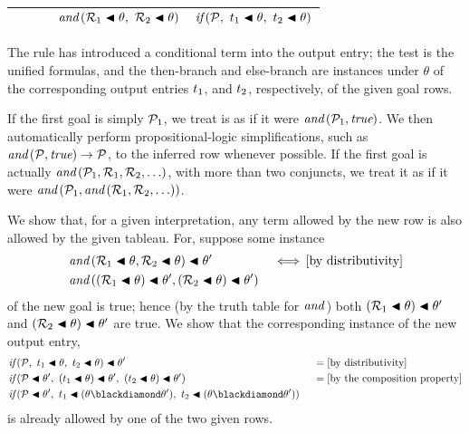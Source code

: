 \documentclass[runningheads]{llncs}
\DeclareMathOperator{\uand}{\emph{and}\,}
\DeclareMathOperator{\uiff}{\iff}
\begin{document}
  \begin{center}
\begin{tabular} {T}
\hline
    $\qquad$ & $\uand(\expsub{\mathcal{R}}{1} \apply \theta, \ \expsub{\mathcal{R}}{2} \apply \theta)$ &  $\emph{if}\,( {\mathcal{P}},\allowbreak \ {{t}_{1} \blacktriangleleft \theta},\allowbreak \ {{t}_{2} \blacktriangleleft \theta})$ \\
  \hline
\end{tabular}
\end{center}

\noindent The rule has introduced a conditional term into the output entry;  the test is the unified formulas, and the then-branch and else-branch are instances under $\theta$ of the corresponding output entries  ${t}_{1}$, and ${t}_{2}$, respectively, of the given goal rows.

If the first goal is simply ${\mathcal{P}}_{1}$, we treat is as if it were $\uand(\expsub{\mathcal{P}}{1},\true)$. We then automatically perform propositional-logic simplifications, such as $\uand(\mathcal{P}, \true) \rightarrow \mathcal{P}$, to the inferred row whenever possible.  If the first goal is actually 
$\uand(\expsub{\mathcal{P}}{1},\expsub{\mathcal{R}}{1},\allowbreak \expsub{\mathcal{R}}{2}, \ldots)$, with more than two conjuncts, we treat it as if it were $\uand(\expsub{\mathcal{P}}{1}, \uand(\expsub{\mathcal{R}}{1},\allowbreak \expsub{\mathcal{R}}{2}, \ldots))$.

We show that, for a given interpretation, any term allowed by the new row is also allowed by the given tableau. For, suppose some instance  
\begin{align*}
&\uand(
\expsub{\mathcal{R}}{1}\apply \theta,
\expsub{\mathcal{R}}{2}\apply \theta) \apply \theta' \  \, &&\uiff 
   \text{[by distributivity]} \\
&\uand(
(\expsub{\mathcal{R}}{1}\apply \theta)\apply \theta',
(\expsub{\mathcal{R}}{2}\apply \theta)\apply \theta') 
\end{align*}
of the new goal  is true; hence (by the truth table for $\uand$) both $({\mathcal{R}}_{1}\blacktriangleleft \theta)\blacktriangleleft \theta'$ and $({\mathcal{R}}_{2}\blacktriangleleft \theta)\blacktriangleleft \theta'$ are true. We show that the corresponding instance  
of the new output entry,
 \begin{align*}
   &\cond 
   {\mathcal{P}} 
   {\expsub{t}{1} \apply \theta} 
   {\expsub{t}{2} \apply \theta} \apply \theta'\
      &&=  \text{[by distributivity]} \\
     &\cond 
     {\mathcal{P}\apply \theta'} 
     {(\expsub{t}{1} \apply \theta) \apply \theta'} 
     {(\expsub{t}{2} \apply \theta) \apply \theta'} \ 
       &&=  \text{[by the composition property]} \\
     &\cond 
     {\mathcal{P}\apply \theta'} 
     {\expsub{t}{1} \apply (\theta \compose \theta')} 
     {\expsub{t}{2} \apply (\theta \compose \theta')} \ 
 \end{align*}
 is already allowed by one of the two given rows.
 
\end{document}
